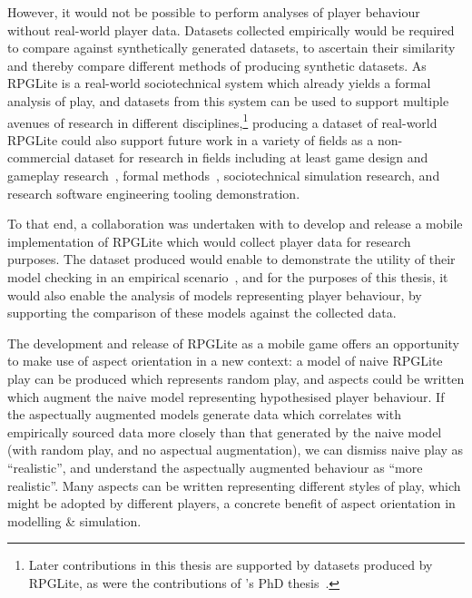 However, it would not be possible to perform analyses of player behaviour
without real-world player data. Datasets collected empirically would be required
to compare against synthetically generated datasets, to ascertain their
similarity and thereby compare different methods of producing synthetic
datasets. As RPGLite is a real-world sociotechnical system which already yields
a formal analysis of play, and datasets from this system can be used to support
multiple avenues of research in different disciplines,\footnote{Later
contributions in this thesis are supported by datasets produced by RPGLite, as
were the contributions of \citeauthor{kavanagh2021thesis}'s PhD
thesis~\cite{kavanagh2021thesis}.} producing a dataset of real-world RPGLite
could also support future work in a variety of fields as a non-commercial
dataset for research in fields including at least game design and gameplay
research~\cite{kavanagh2021thesis}, formal methods~\cite{kavanagh2020},
sociotechnical simulation research, and research software engineering tooling
demonstration.

To that end, a collaboration was undertaken
with \citeauthor{kavanagh2021thesis} to develop and release a mobile
implementation of RPGLite which would collect player data for research purposes.
The dataset produced would enable \citeauthor{kavanagh2021thesis} to demonstrate
the utility of their model checking in an empirical
scenario~\cite{kavanagh2021thesis}, and for the purposes of this thesis, it
would also enable the analysis of models representing player behaviour, by
supporting the comparison of these models against the collected data.

The
development and release of RPGLite as a mobile game offers an opportunity to
make use of aspect orientation in a new context: a model of naive RPGLite play
can be produced which represents random play,
and aspects could be written which augment the naive model representing
hypothesised player behaviour. If the aspectually augmented models generate data
which correlates with empirically sourced data more closely than that generated
by the naive model (with random play, and no aspectual augmentation), we can
dismiss naive play as ``realistic'', and understand the aspectually augmented
behaviour as ``more realistic''. Many aspects can be written representing
different styles of play, which might be adopted by different players, a
concrete benefit of aspect orientation in modelling \& simulation.

